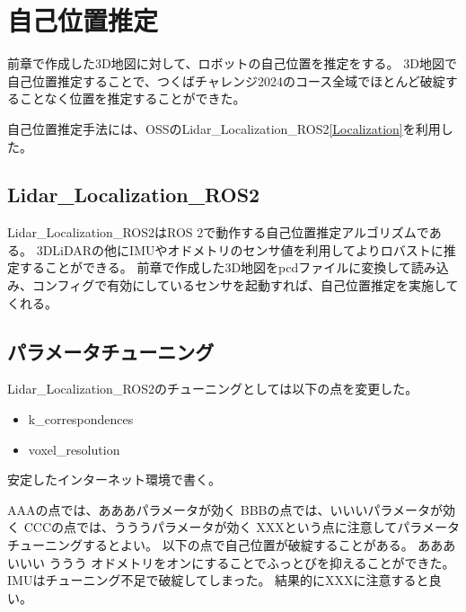 \section{自己位置推定}
前章で作成した3D地図に対して、ロボットの自己位置を推定をする。
3D地図で自己位置推定することで、つくばチャレンジ2024のコース全域でほとんど破綻することなく位置を推定することができた。

自己位置推定手法には、OSSのLidar\_Localization\_ROS2\ref{Localization}を利用した。

\subsection{Lidar\_Localization\_ROS2}
Lidar\_Localization\_ROS2はROS 2で動作する自己位置推定アルゴリズムである。
3DLiDARの他にIMUやオドメトリのセンサ値を利用してよりロバストに推定することができる。
前章で作成した3D地図をpcdファイルに変換して読み込み、コンフィグで有効にしているセンサを起動すれば、自己位置推定を実施してくれる。

\subsection{パラメータチューニング}
Lidar\_Localization\_ROS2のチューニングとしては以下の点を変更した。
\begin{itemize}
    \item k\_correspondences
    \item voxel\_resolution
\end{itemize}

安定したインターネット環境で書く。


AAAの点では、あああパラメータが効く
BBBの点では、いいいパラメータが効く
CCCの点では、うううパラメータが効く
XXXという点に注意してパラメータチューニングするとよい。
以下の点で自己位置が破綻することがある。
あああ
いいい
ううう
オドメトリをオンにすることでふっとびを抑えることができた。
IMUはチューニング不足で破綻してしまった。
結果的にXXXに注意すると良い。